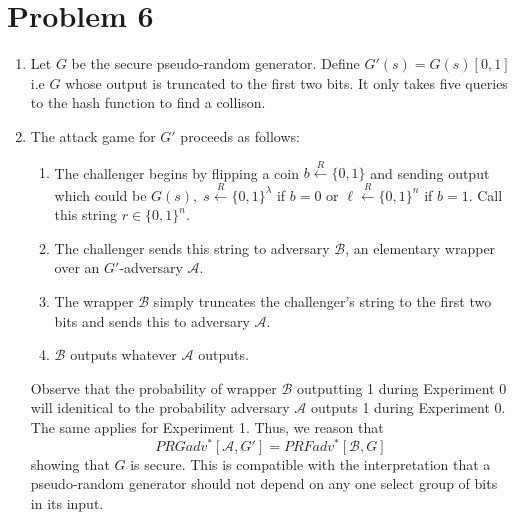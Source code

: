 \documentclass[11pt]{article}
\begin{document}
\section*{Problem 6}
\begin{enumerate}
  \item Let $G$ be the secure pseudo-random generator. Define $G'(s) = G(s)[0,1]$ i.e $G$ whose output is truncated to the first two bits. It only takes five queries to the hash function to find a collison.
  \item The attack game for $G'$ proceeds as follows:
  \begin{enumerate}
    \item The challenger begins by flipping a coin $b \xleftarrow{R} \{0,1\}$ and sending output which could be $G(s), \; s \xleftarrow{R} \{0,1\}^{\lambda}$ if $b = 0$ or $\ell \xleftarrow{R} \{0,1\}^n$ if $b = 1$. Call this string $r \in \{0,1\}^n$.
    \item The challenger sends this string to adversary $\mathcal{B}$, an elementary wrapper over an $G'$-adversary $\mathcal{A}$.
    \item The wrapper $\mathcal{B}$ simply truncates the challenger's string to the first two bits and sends this to adversary $\mathcal{A}$.
    \item $\mathcal{B}$ outputs whatever $\mathcal{A}$ outputs.
  \end{enumerate}
  Observe that the probability of wrapper $\mathcal{B}$ outputting 1 during Experiment 0 will idenitical to the probability adversary $\mathcal{A}$ outputs 1 during Experiment 0. The same applies for Experiment 1. Thus, we reason that
  \[ PRGadv^*[\mathcal{A}, G'] = PRFadv^*[\mathcal{B}, G] \] showing that $G$ is secure. This is compatible with the interpretation that a pseudo-random generator should not depend on any one select group of bits in its input.
\end{enumerate}
\end{document}
